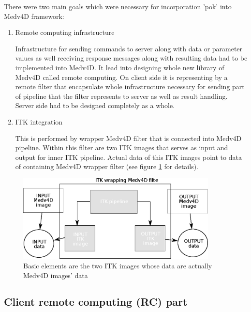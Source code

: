 \par
There were two main goals which were necessary for incorporation 'pok' into
Medv4D framework:
\begin{enumerate}

  \item{Remote computing infrastructure}
  \par
  Infrastructure for sending commands to server along with data or parameter values as well receiving response messages along with resulting data had to be implemented into Medv4D.
It lead into designing whole new library of Medv4D called remote computing.
On client side it is representing by a remote filter that encapsulate whole infrastructure necessary for sending part of pipeline that the filter represents to server as well as result handling.
Server side had to be designed completely as a whole.

  \item{ITK integration}
  \par
  This is performed by wrapper Medv4D filter that is connected into Medv4D pipeline.
Within this filter are two ITK images that serves as input and output for inner ITK pipeline.
Actual data of this ITK images point to data of containing Medv4D wrapper filter (see figure \ref{fg:ITKWrapping} for details).

\end{enumerate}

\begin{figure}
    \centering
    \includegraphics[width=0.9\textwidth]{data/ITKFilter}
    \caption[ITK wrapper Medv4D filter]{Basic elements are the two ITK images whose data are actually Medv4D images' data}
    \label{fg:ITKWrapping}
\end{figure}

\subsection{Client remote computing (RC) part}

